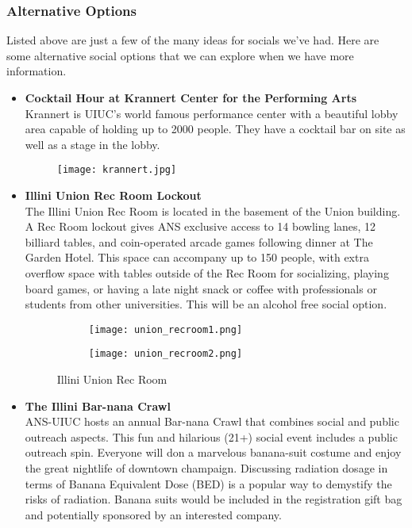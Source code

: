 \subsubsection{Alternative Options}

Listed above are just a few of the many ideas for socials we've had. Here are some alternative social options that we can explore when we have more information. 

\begin{itemize}
	\item \textbf{Cocktail Hour at Krannert Center for the Performing Arts}\\
	Krannert is UIUC's world famous performance center with a beautiful lobby area capable of holding up to 2000 people. They have a cocktail bar on site as well as a stage in the lobby.
	\begin{figure}[H]
		\centering
		\texttt{[image: krannert.jpg]}
	\end{figure}
	\item \textbf{Illini Union Rec Room Lockout}\\
	The Illini Union Rec Room is located in the basement of the Union building. A Rec Room lockout gives ANS exclusive access to 14 bowling lanes, 12 billiard tables, and coin-operated arcade games following dinner at The Garden Hotel. This space can accompany up to 150 people, with extra overflow space with tables outside of the Rec Room for socializing, playing board games, or having a late night snack or coffee with professionals or students from other universities. This will be an alcohol free social option.
	\begin{figure}[H]
	\centering
	\begin{subfigure}{0.5\textwidth}
		\centering
		\texttt{[image: union\_recroom1.png]}
	\end{subfigure}%
	\begin{subfigure}{0.5\textwidth}
		\centering
		\texttt{[image: union\_recroom2.png]}
	\end{subfigure}	
	\caption{Illini Union Rec Room}	
\end{figure}
	\item \textbf{The Illini Bar-nana Crawl}\\
	ANS-UIUC hosts an annual Bar-nana Crawl that combines social and public outreach aspects. This fun and hilarious (21+) social event includes a public outreach spin. Everyone will don a marvelous banana-suit costume and enjoy the great nightlife of downtown champaign. Discussing radiation dosage in terms of Banana Equivalent Dose (BED) is a popular way to demystify the risks of radiation. Banana suits would be included in the registration gift bag and potentially sponsored by an interested company. 
\end{itemize}

